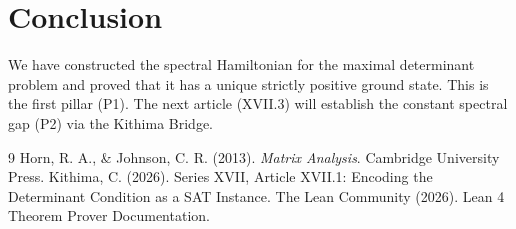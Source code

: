 \documentclass[11pt,a4paper]{article}
\begin{document}
\section{Conclusion}

We have constructed the spectral Hamiltonian for the maximal determinant problem and proved that it has a unique strictly positive ground state. This is the first pillar (P1). The next article (XVII.3) will establish the constant spectral gap (P2) via the Kithima Bridge.


\begin{thebibliography}{9}
  Horn, R. A., \& Johnson, C. R. (2013). \emph{Matrix Analysis}. Cambridge University Press.
  Kithima, C. (2026). Series XVII, Article XVII.1: Encoding the Determinant Condition as a SAT Instance.
  The Lean Community (2026). Lean 4 Theorem Prover Documentation.
\end{thebibliography}
\end{document}
